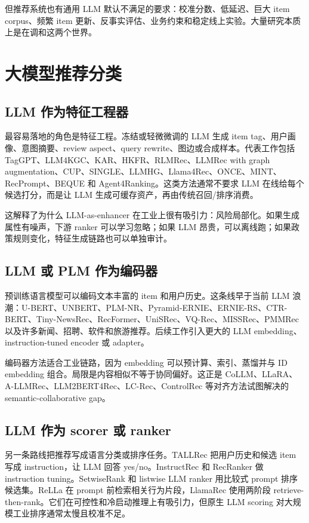 \documentclass[UTF8,fontset=fandol,11pt]{ctexart}
\begin{document}
但推荐系统也有通用 LLM 默认不满足的要求：校准分数、低延迟、巨大 item corpus、频繁 item 更新、反事实评估、业务约束和稳定线上实验。大量研究本质上是在调和这两个世界。

\section{大模型推荐分类}

\subsection{LLM 作为特征工程器}

最容易落地的角色是特征工程。冻结或轻微微调的 LLM 生成 item tag、用户画像、意图摘要、review aspect、query rewrite、图边或合成样本。代表工作包括 TagGPT、LLM4KGC、KAR、HKFR、RLMRec、LLMRec with graph augmentation、CUP、SINGLE、LLMHG、Llama4Rec、ONCE、MINT、RecPrompt、BEQUE 和 Agent4Ranking。这类方法通常不要求 LLM 在线给每个候选打分，而是让 LLM 生成可缓存资产，再由传统召回/排序消费。

这解释了为什么 LLM-as-enhancer 在工业上很有吸引力：风险局部化。如果生成属性有噪声，下游 ranker 可以学习忽略；如果 LLM 昂贵，可以离线跑；如果政策规则变化，特征生成链路也可以单独审计。

\subsection{LLM 或 PLM 作为编码器}

预训练语言模型可以编码文本丰富的 item 和用户历史。这条线早于当前 LLM 浪潮：U-BERT、UNBERT、PLM-NR、Pyramid-ERNIE、ERNIE-RS、CTR-BERT、Tiny-NewsRec、RecFormer、UniSRec、VQ-Rec、MISSRec、PMMRec 以及许多新闻、招聘、软件和旅游推荐。后续工作引入更大的 LLM embedding、instruction-tuned encoder 或 adapter。

编码器方法适合工业链路，因为 embedding 可以预计算、索引、蒸馏并与 ID embedding 组合。局限是内容相似不等于协同偏好。这正是 CoLLM、LLaRA、A-LLMRec、LLM2BERT4Rec、LC-Rec、ControlRec 等对齐方法试图解决的 semantic-collaborative gap。

\subsection{LLM 作为 scorer 或 ranker}

另一条路线把推荐写成语言分类或排序任务。TALLRec 把用户历史和候选 item 写成 instruction，让 LLM 回答 yes/no。InstructRec 和 RecRanker 做 instruction tuning。SetwiseRank 和 listwise LLM ranker 用比较式 prompt 排序候选集。ReLLa 在 prompt 前检索相关行为片段，LlamaRec 使用两阶段 retrieve-then-rank。它们在可控性和冷启动推理上有吸引力，但原生 LLM scoring 对大规模工业排序通常太慢且校准不足。
\end{document}
